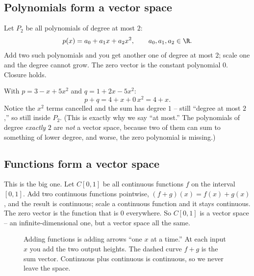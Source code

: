 \subsection{Polynomials form a vector space}

Let $P_2$ be all polynomials of degree at most $2$:
\[
p(x) = a_0 + a_1 x + a_2 x^2, \qquad a_0,a_1,a_2 \in \R.
\]
Add two such polynomials and you get another one of degree at most $2$; scale one and the
degree cannot grow. The zero vector is the constant polynomial $0$. Closure holds.

\begin{example}\label{ch11:poly-space}
With $p = 3 - x + 5x^2$ and $q = 1 + 2x - 5x^2$:
\[
p + q = 4 + x + 0\,x^2 = 4 + x.
\]
Notice the $x^2$ terms cancelled and the sum has degree $1$ -- still ``degree at most
$2$,'' so still inside $P_2$. (This is exactly why we say ``at most.'' The polynomials of
degree \emph{exactly} $2$ are \emph{not} a vector space, because two of them can sum to
something of lower degree, and worse, the zero polynomial is missing.)
\end{example}

\subsection{Functions form a vector space}

This is the big one. Let $C[0,1]$ be all continuous functions $f$ on the interval
$[0,1]$. Add two continuous functions pointwise, $(f+g)(x) = f(x)+g(x)$, and the result is
continuous; scale a continuous function and it stays continuous. The zero vector is the
function that is $0$ everywhere. So $C[0,1]$ is a vector space -- an infinite-dimensional
one, but a vector space all the same.

\begin{figure}[H]
\centering
{}
\caption{Adding functions is adding arrows ``one $x$ at a time.'' At each input $x$ you
add the two output heights. The dashed curve $f+g$ is the sum vector. Continuous plus
continuous is continuous, so we never leave the space.}
\label{ch11:fig-funcadd}
\end{figure}

